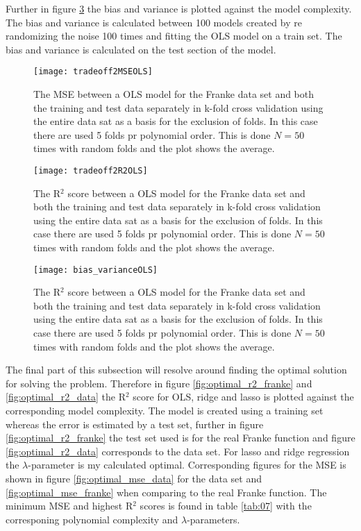\documentclass[uio,jmp,amsmath,amssymb,reprint,nofootinbib]{revtex4-1}
\numberwithin{equation}{section}
\begin{document}
Further in figure \ref{fig:bias_varianceOLS} the bias and variance is plotted against the model complexity. The bias and variance is calculated between 100 models created by re randomizing the noise 100 times and fitting the OLS model on a train set. The bias and variance is calculated on the test section of the model.

\begin{figure}[H]
    \centering
    \texttt{[image: tradeoff2MSEOLS]}
    \caption{The MSE between a OLS model for the Franke data set and both the training and test data separately in k-fold cross validation using the entire data sat as a basis for the exclusion of folds. In this case there are used 5 folds pr polynomial order. This is done \(N=50\) times with random folds and the plot shows the average.}
    \label{fig:test_vs_train}
\end{figure}

\begin{figure}[H]
    \centering
    \texttt{[image: tradeoff2R2OLS]}
    \caption{The R\(^2\) score between a OLS model for the Franke data set and both the training and test data separately in k-fold cross validation using the entire data sat as a basis for the exclusion of folds. In this case there are used 5 folds pr polynomial order. This is done \(N=50\) times with random folds and the plot shows the average.}
    \label{fig:test_vs_trainR2}
\end{figure}


\begin{figure}[H]
    \centering
    \texttt{[image: bias\_varianceOLS]}
    \caption{The R\(^2\) score between a OLS model for the Franke data set and both the training and test data separately in k-fold cross validation using the entire data sat as a basis for the exclusion of folds. In this case there are used 5 folds pr polynomial order. This is done \(N=50\) times with random folds and the plot shows the average.}
    \label{fig:bias_varianceOLS}
\end{figure}

The final part of this subsection will resolve around finding the optimal solution for solving the problem. Therefore in figure \ref{fig:optimal_r2_franke} and \ref{fig:optimal_r2_data} the R\(^2\) score for OLS, ridge and lasso is plotted against the corresponding model complexity. The model is created using a training set whereas the error is estimated by a test set, further in figure \ref{fig:optimal_r2_franke} the test set used is for the real Franke function and figure \ref{fig:optimal_r2_data} corresponds to the data set. For lasso and ridge regression the \(\lambda\)-parameter is my calculated optimal. Corresponding figures for the MSE is shown in figure \ref{fig:optimal_mse_data} for the data set and \ref{fig:optimal_mse_franke} when comparing to the real Franke function. The minimum MSE and highest R\(^2\) scores is found in table \ref{tab:07} with the corresponing polynomial complexity and \(\lambda\)-parameters.
\end{document}

